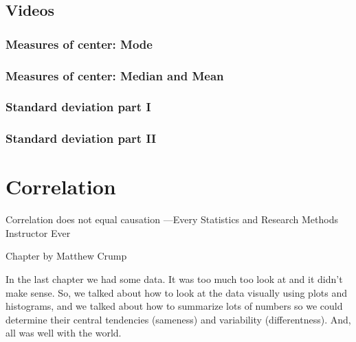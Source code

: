 \documentclass[
]{book}
\begin{document}
\hypertarget{videos}{%
\section{Videos}\label{videos}}

\hypertarget{measures-of-center-mode}{%
\subsection{Measures of center: Mode}\label{measures-of-center-mode}}

\hypertarget{measures-of-center-median-and-mean}{%
\subsection{Measures of center: Median and Mean}\label{measures-of-center-median-and-mean}}

\hypertarget{standard-deviation-part-i}{%
\subsection{Standard deviation part I}\label{standard-deviation-part-i}}

\hypertarget{standard-deviation-part-ii}{%
\subsection{Standard deviation part II}\label{standard-deviation-part-ii}}

\hypertarget{Correlation}{%
\chapter{Correlation}\label{Correlation}}

{
Correlation does not equal causation
---Every Statistics and Research Methods Instructor Ever
}

\begin{marginnote}

Chapter by Matthew Crump

\end{marginnote}

In the last chapter we had some data. It was too much too look at and it didn't make sense. So, we talked about how to look at the data visually using plots and histograms, and we talked about how to summarize lots of numbers so we could determine their central tendencies (sameness) and variability (differentness). And, all was well with the world.
\end{document}
